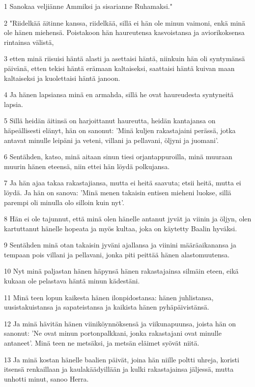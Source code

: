 \par 1 Sanokaa veljiänne Ammiksi ja sisarianne Ruhamaksi."
\par 2 "Riidelkää äitinne kanssa, riidelkää, sillä ei hän ole minun vaimoni, enkä minä ole hänen miehensä. Poistakoon hän haureutensa kasvoistansa ja aviorikoksensa rintainsa välistä,
\par 3 etten minä riisuisi häntä alasti ja asettaisi häntä, niinkuin hän oli syntymänsä päivänä, etten tekisi häntä erämaan kaltaiseksi, saattaisi häntä kuivan maan kaltaiseksi ja kuolettaisi häntä janoon.
\par 4 Ja hänen lapsiansa minä en armahda, sillä he ovat haureudesta syntyneitä lapsia.
\par 5 Sillä heidän äitinsä on harjoittanut haureutta, heidän kantajansa on häpeällisesti elänyt, hän on sanonut: 'Minä kuljen rakastajaini perässä, jotka antavat minulle leipäni ja veteni, villani ja pellavani, öljyni ja juomani'.
\par 6 Sentähden, katso, minä aitaan sinun tiesi orjantappuroilla, minä muuraan muurin hänen eteensä, niin ettei hän löydä polkujansa.
\par 7 Ja hän ajaa takaa rakastajiansa, mutta ei heitä saavuta; etsii heitä, mutta ei löydä. Ja hän on sanova: 'Minä menen takaisin entisen mieheni luokse, sillä parempi oli minulla olo silloin kuin nyt'.
\par 8 Hän ei ole tajunnut, että minä olen hänelle antanut jyvät ja viinin ja öljyn, olen kartuttanut hänelle hopeata ja myös kultaa, joka on käytetty Baalin hyväksi.
\par 9 Sentähden minä otan takaisin jyväni ajallansa ja viinini määräaikanansa ja tempaan pois villani ja pellavani, jonka piti peittää hänen alastomuutensa.
\par 10 Nyt minä paljastan hänen häpynsä hänen rakastajainsa silmäin eteen, eikä kukaan ole pelastava häntä minun kädestäni.
\par 11 Minä teen lopun kaikesta hänen ilonpidostansa: hänen juhlistansa, uusistakuistansa ja sapateistansa ja kaikista hänen pyhäpäivistänsä.
\par 12 Ja minä hävitän hänen viiniköynnöksensä ja viikunapuunsa, joista hän on sanonut: 'Ne ovat minun portonpalkkani, jonka rakastajani ovat minulle antaneet'. Minä teen ne metsäksi, ja metsän eläimet syövät niitä.
\par 13 Ja minä kostan hänelle baalien päivät, joina hän niille poltti uhreja, koristi itsensä renkaillaan ja kaulakäädyillään ja kulki rakastajainsa jäljessä, mutta unhotti minut, sanoo Herra.
